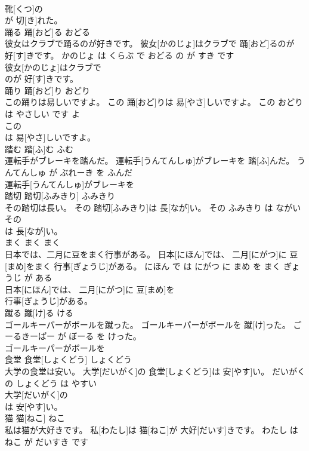 \documentclass[8pt]{extreport}
\begin{document}
\begin{CJK}{UTF8}{min}
\\	靴[くつ]の
\\	が 切[き]れた。			
\\	踊る	踊[おど]る	おどる	
\\	彼女はクラブで踊るのが好きです。	彼女[かのじょ]はクラブで 踊[おど]るのが 好[す]きです。	かのじょ は くらぶ で おどる の が すき です	
\\	彼女[かのじょ]はクラブで
\\	のが 好[す]きです。			
\\	踊り	踊[おど]り	おどり	
\\	この踊りは易しいですよ。	この 踊[おど]りは 易[やさ]しいですよ。	この おどり は やさしい です よ	
\\	この
\\	は 易[やさ]しいですよ。			
\\	踏む	踏[ふ]む	ふむ	
\\	運転手がブレーキを踏んだ。	運転手[うんてんしゅ]がブレーキを 踏[ふ]んだ。	うんてんしゅ が ぶれーき を ふんだ	
\\	運転手[うんてんしゅ]がブレーキを
\\	踏切	踏切[ふみきり]	ふみきり	
\\	その踏切は長い。	その 踏切[ふみきり]は 長[なが]い。	その ふみきり は ながい	
\\	その
\\	は 長[なが]い。			
\\	まく	まく	まく	
\\	日本では、二月に豆をまく行事がある。	日本[にほん]では、 二月[にがつ]に 豆[まめ]をまく 行事[ぎょうじ]がある。	にほん で は にがつ に まめ を まく ぎょうじ が ある	
\\	日本[にほん]では、 二月[にがつ]に 豆[まめ]を
\\	行事[ぎょうじ]がある。			
\\	蹴る	蹴[け]る	ける	
\\	ゴールキーパーがボールを蹴った。	ゴールキーパーがボールを 蹴[け]った。	ごーるきーぱー が ぼーる を けった。	
\\	ゴールキーパーがボールを
\\	食堂	食堂[しょくどう]	しょくどう	
\\	大学の食堂は安い。	大学[だいがく]の 食堂[しょくどう]は 安[やす]い。	だいがく の しょくどう は やすい	
\\	大学[だいがく]の
\\	は 安[やす]い。			
\\	猫	猫[ねこ]	ねこ	
\\	私は猫が大好きです。	私[わたし]は 猫[ねこ]が 大好[だいす]きです。	わたし は ねこ が だいすき です	

\end{CJK}
\end{document}
